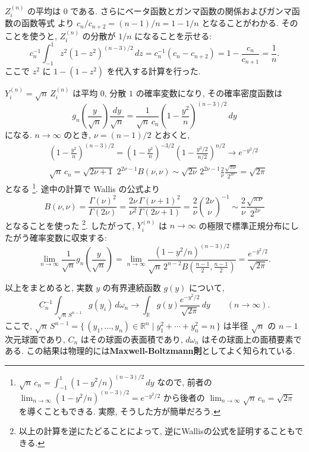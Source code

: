 \documentclass[12pt,twoside]{jarticle}
\newcommand\R{{\mathbb R}} %
\theoremstyle{jplain}
\theoremstyle{jplain}
\theoremstyle{jplain}
\numberwithin{theorem}{section}
\numberwithin{equation}{section}
\numberwithin{figure}{section}
\numberwithin{table}{section}
\begin{document}
$Z^{(n)}_i$ の平均は $0$ である.
さらにベータ函数とガンマ函数の関係およびガンマ函数の函数等式
より $c_n/c_{n+2}=(n-1)/n=1-1/n$ となることがわかる.
そのことを使うと, $Z^{(n)}_i$ の分散が $1/n$ になることを示せる:
\[
c_n^{-1}\int_{-1}^1 z^2(1-z^2)^{(n-3)/2}\,dz
=c_n^{-1}(c_n-c_{n+2})
=1-\frac{c_n}{c_{n+1}}
=\frac{1}{n}.
\]
ここで $z^2$ に $1-(1-z^2)$ を代入する計算を行った.

$Y^{(n)}_i=\sqrt{n}\,Z^{(n)}_i$ は平均 $0$, 分散 $1$ の確率変数になり, その確率密度函数は
\[
g_n\left(\frac{y}{\sqrt{n}}\right)\frac{dy}{\sqrt{n}}
=\frac{1}{\sqrt{n}\,c_n} \left(1-\frac{y^2}{n}\right)^{(n-3)/2}\,dy
\]
になる.  $n\to\infty$ のとき, $\nu=(n-1)/2$ とおくと,
\begin{align*}
&
\left(1-\frac{y^2}{n}\right)^{(n-3)/2}
=\left(1-\frac{y^2}{n}\right)^{-3/2} \left(1-\frac{y^2/2}{n/2}\right)^{n/2}
\longrightarrow e^{-y^2/2}
\\ &
\sqrt{n}\,c_n
=\sqrt{2\nu+1}\,\,2^{2\nu-1}B(\nu,\nu)
\sim
\sqrt{2\nu}\,2^{2\nu-1}\frac{2}{\nu}\frac{\sqrt{\pi\nu}}{2^{2\nu}}
=\sqrt{2\pi}
\end{align*}
となる%
\footnote{$\sqrt{n}\,c_n=\int_{-1}^1(1-y^2/n)^{(n-3)/2}\,dy$ なので,
前者の \(
\lim_{n\to\infty}(1-y^2/n)^{(n-3)/2}=e^{-y^2/2}
\) から後者の $\lim_{n\to\infty}\sqrt{n}\,c_n=\sqrt{2\pi}$ を導くこともできる.
実際, そうした方が簡単だろう. }. %
途中の計算で Wallis の公式より
\[
B(\nu,\nu)
= \frac{\Gamma(\nu)^2}{\Gamma(2\nu)}
= \frac{2\nu}{\nu^2}\frac{\Gamma(\nu+1)^2}{\Gamma(2\nu+1)}
= \frac{2}{\nu}\binom{2\nu}{\nu}^{-1}
\sim \frac{2}{\nu}\frac{\sqrt{\pi\nu}}{2^{2\nu}}
\]
となることを使った%
\footnote{以上の計算を逆にたどることによって, 逆にWallisの公式を証明することもできる.}.
したがって, $Y^{(n)}_i$ は $n\to\infty$ の極限で標準正規分布にしたがう確率変数に収束する:
\[
\lim_{n\to\infty}
\frac{1}{\sqrt{n}}g_n\left(\frac{y}{\sqrt{n}}\right)
=\lim_{n\to\infty}
\frac{(1-y^2/n)^{(n-3)/2}}{\sqrt{n}\,2^{n-2}B(\frac{n-1}{2},\frac{n-1}{2})}
=\frac{e^{-y^2/2}}{\sqrt{2\pi}}.
\]

以上をまとめると, 実数 $y$ の有界連続函数 $g(y)$ について,
\[
C_n^{-1}\int_{\sqrt{n}\,S^{n-1}} g(y_i) \,d\omega_n
\longrightarrow
\int_\R g(y)\frac{e^{-y^2/2}}{\sqrt{2\pi}}\,dy
\qquad (n\to\infty).
\]
ここで, $\sqrt{n}\,S^{n-1}=\{\,(y_1,\ldots,y_n)\in\R^n\mid y_1^2+\cdots+y_n^2=n \,\}$
は半径 $\sqrt{n}$ の $n-1$ 次元球面であり,
$C_n$ はその球面の表面積であり,
$d\omega_n$ はその球面上の面積要素である.
この結果は物理的には{\bfseries Maxwell-Boltzmann則}としてよく知られている.
\end{document}
